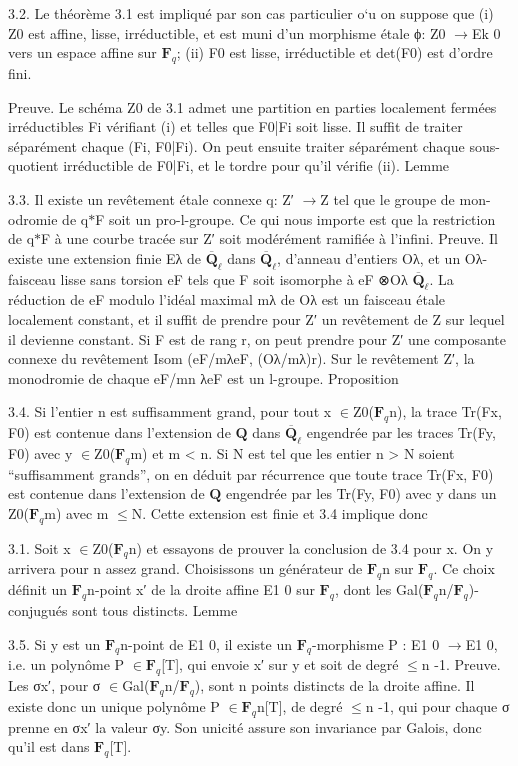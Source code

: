 \documentclass[11pt]{article}
\begin{document}
3.2. Le théorème 3.1 est impliqué par son cas particulier o`u on suppose que (i) Z0 est affine, lisse, irréductible, et est muni d’un morphisme étale ϕ: Z0 \(\to\)Ek 0 vers un espace affine sur \(\mathbf F_q\); (ii) F0 est lisse, irréductible et det(F0) est d’ordre fini.

Preuve. Le schéma Z0 de 3.1 admet une partition en parties localement fermées irréductibles Fi vérifiant (i) et telles que F0|Fi soit lisse. Il suffit de traiter séparément chaque (Fi, F0|Fi). On peut ensuite traiter séparément chaque sous-quotient irréductible de F0|Fi, et le tordre pour qu’il vérifie (ii). Lemme 

3.3. Il existe un revêtement étale connexe q: Z′ \(\to\)Z tel que le groupe de mon- odromie de q\(*\)F soit un pro-l-groupe. Ce qui nous importe est que la restriction de q\(*\)F à une courbe tracée sur Z′ soit modérément ramifiée à l’infini. Preuve. Il existe une extension finie Eλ de \(\overline{\mathbf Q}_\ell\) dans \(\overline{\mathbf Q}_\ell\), d’anneau d’entiers Oλ, et un Oλ- faisceau lisse sans torsion eF tels que F soit isomorphe à eF ⊗Oλ \(\overline{\mathbf Q}_\ell\). La réduction de eF modulo l’idéal maximal mλ de Oλ est un faisceau étale localement constant, et il suffit de prendre pour Z′ un revêtement de Z sur lequel il devienne constant. Si F est de rang r, on peut prendre pour Z′ une composante connexe du revêtement Isom (eF/mλeF, (Oλ/mλ)r). Sur le revêtement Z′, la monodromie de chaque eF/mn λeF est un l-groupe. Proposition 

3.4. Si l’entier n est suffisamment grand, pour tout x \(\in\)Z0(\(\mathbf F_q\)n), la trace Tr(Fx, F0) est contenue dans l’extension de \(\mathbf Q\) dans \(\overline{\mathbf Q}_\ell\) engendrée par les traces Tr(Fy, F0) avec y \(\in\)Z0(\(\mathbf F_q\)m) et m < n. Si N est tel que les entier n > N soient “suffisamment grands”, on en déduit par récurrence que toute trace Tr(Fx, F0) est contenue dans l’extension de \(\mathbf Q\) engendrée par les Tr(Fy, F0) avec y dans un Z0(\(\mathbf F_q\)m) avec m \(\le\)N. Cette extension est finie et 3.4 implique donc 

3.1. Soit x \(\in\)Z0(\(\mathbf F_q\)n) et essayons de prouver la conclusion de 3.4 pour x. On y arrivera pour n assez grand. Choisissons un générateur de \(\mathbf F_q\)n sur \(\mathbf F_q\). Ce choix définit un \(\mathbf F_q\)n-point x′ de la droite affine E1 0 sur \(\mathbf F_q\), dont les Gal(\(\mathbf F_q\)n/\(\mathbf F_q\))-conjugués sont tous distincts. Lemme 

3.5. Si y est un \(\mathbf F_q\)n-point de E1 0, il existe un \(\mathbf F_q\)-morphisme P : E1 0 \(\to\)E1 0, i.e. un polynôme P \(\in\)\(\mathbf F_q\)[T], qui envoie x′ sur y et soit de degré \(\le\)n -1. Preuve. Les σx′, pour σ \(\in\)Gal(\(\mathbf F_q\)n/\(\mathbf F_q\)), sont n points distincts de la droite affine. Il existe donc un unique polynôme P \(\in\)\(\mathbf F_q\)n[T], de degré \(\le\)n -1, qui pour chaque σ prenne en σx′ la valeur σy. Son unicité assure son invariance par Galois, donc qu’il est dans \(\mathbf F_q\)[T].
\end{document}
